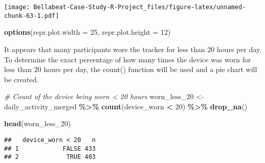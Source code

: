 \documentclass[
]{article}
\newenvironment{Shaded}{\begin{snugshade}}{\end{snugshade}}
\newcommand{\AttributeTok}[1]{\textcolor[rgb]{0.13,0.29,0.53}{#1}}
\newcommand{\CommentTok}[1]{\textcolor[rgb]{0.56,0.35,0.01}{\textit{#1}}}
\newcommand{\DecValTok}[1]{\textcolor[rgb]{0.00,0.00,0.81}{#1}}
\newcommand{\FunctionTok}[1]{\textcolor[rgb]{0.13,0.29,0.53}{\textbf{#1}}}
\newcommand{\NormalTok}[1]{#1}
\newcommand{\OtherTok}[1]{\textcolor[rgb]{0.56,0.35,0.01}{#1}}
\newcommand{\SpecialCharTok}[1]{\textcolor[rgb]{0.81,0.36,0.00}{\textbf{#1}}}
\begin{document}
\texttt{[image: Bellabeat-Case-Study-R-Project\_files/figure-latex/unnamed-chunk-63-1.pdf]}

\begin{Shaded}
\begin{Highlighting}[]
\FunctionTok{options}\NormalTok{(}\AttributeTok{repr.plot.width =} \DecValTok{25}\NormalTok{, }\AttributeTok{repr.plot.height =} \DecValTok{12}\NormalTok{)}
\end{Highlighting}
\end{Shaded}

It appears that many participants wore the tracker for less than 20
hours per day. To determine the exact percentage of how many times the
device was worn for less than 20 hours per day, the count() function
will be used and a pie chart will be created.

\begin{Shaded}
\begin{Highlighting}[]
\CommentTok{\# Count of the device being worn \textless{} 20 hours}
\NormalTok{worn\_less\_20 }\OtherTok{\textless{}{-}}\NormalTok{ daily\_activity\_merged }\SpecialCharTok{\%\textgreater{}\%} 
  \FunctionTok{count}\NormalTok{(device\_worn }\SpecialCharTok{\textless{}} \DecValTok{20}\NormalTok{) }\SpecialCharTok{\%\textgreater{}\%} 
  \FunctionTok{drop\_na}\NormalTok{()}

\FunctionTok{head}\NormalTok{(worn\_less\_20)}
\end{Highlighting}
\end{Shaded}

\begin{verbatim}
##   device_worn < 20   n
## 1            FALSE 433
## 2             TRUE 403
\end{verbatim}
\end{document}
